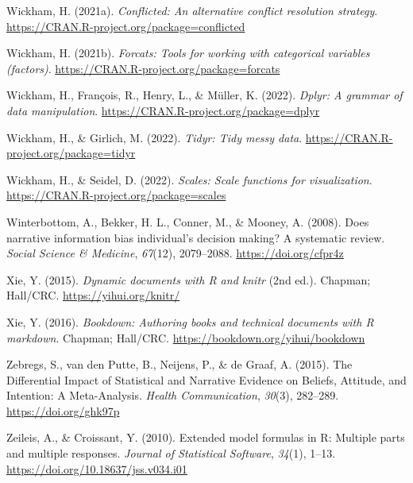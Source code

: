 \documentclass[
  man, donotrepeattitle,floatsintext]{apa7}
\newlength{\cslhangindent}
\newlength{\cslentryspacingunit} %
\newenvironment{CSLReferences}[2] %
 {%
  \setlength{\parindent}{0pt}
  \ifodd #1
  \let\oldpar\par
  \def\par{\hangindent=\cslhangindent\oldpar}
  \fi
  \setlength{\parskip}{#2\cslentryspacingunit}
 }%
 {}
\theoremstyle{definition}
\theoremstyle{definition}
\theoremstyle{definition}
\theoremstyle{definition}
\theoremstyle{remark}
\begin{document}
\begin{CSLReferences}{1}{0}
\leavevmode{}%
Wickham, H. (2021a). \emph{Conflicted: An alternative conflict resolution strategy}. \url{https://CRAN.R-project.org/package=conflicted}

\leavevmode{}%
Wickham, H. (2021b). \emph{Forcats: Tools for working with categorical variables (factors)}. \url{https://CRAN.R-project.org/package=forcats}

\leavevmode{}%
Wickham, H., François, R., Henry, L., \& Müller, K. (2022). \emph{Dplyr: A grammar of data manipulation}. \url{https://CRAN.R-project.org/package=dplyr}

\leavevmode{}%
Wickham, H., \& Girlich, M. (2022). \emph{Tidyr: Tidy messy data}. \url{https://CRAN.R-project.org/package=tidyr}

\leavevmode{}%
Wickham, H., \& Seidel, D. (2022). \emph{Scales: Scale functions for visualization}. \url{https://CRAN.R-project.org/package=scales}

\leavevmode{}%
Winterbottom, A., Bekker, H. L., Conner, M., \& Mooney, A. (2008). Does narrative information bias individual's decision making? {A} systematic review. \emph{Social Science \& Medicine}, \emph{67}(12), 2079--2088. \url{https://doi.org/cfpr4z}

\leavevmode{}%
Xie, Y. (2015). \emph{Dynamic documents with {R} and knitr} (2nd ed.). Chapman; Hall/CRC. \url{https://yihui.org/knitr/}

\leavevmode{}%
Xie, Y. (2016). \emph{Bookdown: Authoring books and technical documents with {R} markdown}. Chapman; Hall/CRC. \url{https://bookdown.org/yihui/bookdown}

\leavevmode{}%
Zebregs, S., van den Putte, B., Neijens, P., \& de Graaf, A. (2015). The {Differential Impact} of {Statistical} and {Narrative Evidence} on {Beliefs}, {Attitude}, and {Intention}: {A Meta-Analysis}. \emph{Health Communication}, \emph{30}(3), 282--289. \url{https://doi.org/ghk97p}

\leavevmode{}%
Zeileis, A., \& Croissant, Y. (2010). Extended model formulas in {R}: Multiple parts and multiple responses. \emph{Journal of Statistical Software}, \emph{34}(1), 1--13. \url{https://doi.org/10.18637/jss.v034.i01}

\end{CSLReferences}
\end{document}
